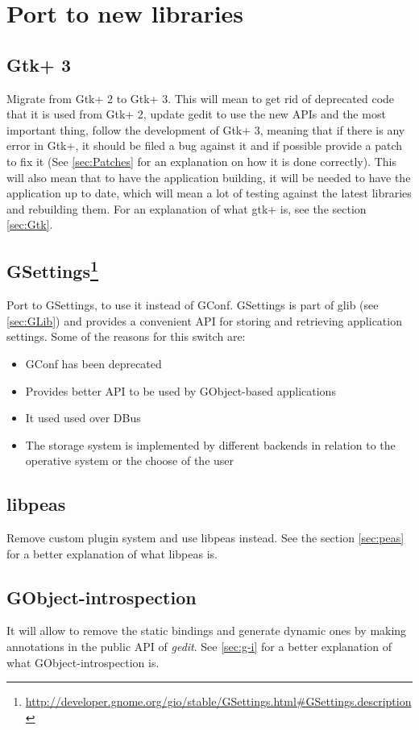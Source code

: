 
\section{Port to new libraries}\label{sec:NewLibraries}

\subsection{Gtk+ 3}\label{sec:Gtk3}

Migrate from Gtk+ 2 to Gtk+ 3. This will mean to get rid of deprecated code that it is used from Gtk+ 2, update gedit to use the new APIs and the most important thing, follow the development of Gtk+ 3, meaning that if there is any error in Gtk+, it should be filed a bug against it and if possible provide a patch to fix it (See \ref{sec:Patches} for an explanation on how it is done correctly). This will also mean that to have the application building, it will be needed to have the application up to date, which will mean a lot of testing against the latest libraries and rebuilding them. For an explanation of what gtk+ is, see the section \ref{sec:Gtk}.

\subsection[GSettings]{GSettings\footnote{\url{http://developer.gnome.org/gio/stable/GSettings.html\#GSettings.description}}}\label{sec:GSettings}

Port to GSettings, to use it instead of GConf. GSettings is part of glib (see \ref{sec:GLib}) and provides a convenient API for storing and retrieving application settings. Some of the reasons for this switch are:
\begin{itemize}
  \item GConf has been deprecated
  \item Provides better API to be used by GObject-based applications
  \item It used used over DBus
  \item The storage system is implemented by different backends in relation to the operative system or the choose of the user
\end{itemize}

\subsection{libpeas}\label{sec:libpeas}

Remove custom plugin system and use libpeas instead. See the section \ref{sec:peas} for a better explanation of what libpeas is.

\subsection{GObject-introspection}\label{sec:GObjectIntrospection}

It will allow to remove the static bindings and generate dynamic ones by making annotations in the public API of \emph{gedit}. See \ref{sec:g-i} for a better explanation of what GObject-introspection is.
